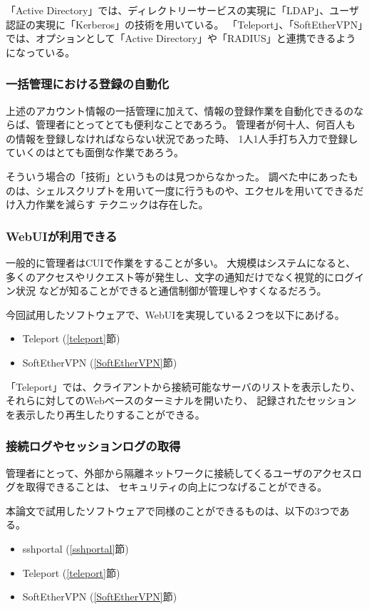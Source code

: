 \documentclass[11pt,a4j,titlepage]{jreport}
\begin{document}
「Active Directory」では、ディレクトリーサービスの実現に「LDAP」、ユーザ認証の実現に「Kerberos」の技術を用いている。
「Teleport」、「SoftEtherVPN」では、オプションとして「Active Directory」や「RADIUS」と連携できるようになっている。

\subsubsection*{一括管理における登録の自動化}
上述のアカウント情報の一括管理に加えて、情報の登録作業を自動化できるのならば、管理者にとってとても便利なことであろう。
管理者が何十人、何百人もの情報を登録しなければならない状況であった時、
1人1人手打ち入力で登録していくのはとても面倒な作業であろう。
\par そういう場合の「技術」というものは見つからなかった。
調べた中にあったものは、シェルスクリプトを用いて一度に行うものや、エクセルを用いてできるだけ入力作業を減らす
テクニックは存在した。

\subsubsection*{WebUIが利用できる}
一般的に管理者はCUIで作業をすることが多い。
大規模はシステムになると、多くのアクセスやリクエスト等が発生し、文字の通知だけでなく視覚的にログイン状況
などが知ることができると通信制御が管理しやすくなるだろう。
\par 今回試用したソフトウェアで、WebUIを実現している２つを以下にあげる。
\begin{itemize}
    \item Teleport (\ref{teleport}節)
    \item SoftEtherVPN (\ref{SoftEtherVPN}節)
\end{itemize}
「Teleport」では、クライアントから接続可能なサーバのリストを表示したり、それらに対してのWebベースのターミナルを開いたり、
記録されたセッションを表示したり再生したりすることができる。


\subsubsection*{接続ログやセッションログの取得}
管理者にとって、外部から隔離ネットワークに接続してくるユーザのアクセスログを取得できることは、
セキュリティの向上につなげることができる。

\par 本論文で試用したソフトウェアで同様のことができるものは、以下の3つである。
\begin{itemize}
    \item sshportal (\ref{sshportal}節)
    \item Teleport (\ref{teleport}節)
    \item SoftEtherVPN (\ref{SoftEtherVPN}節)
\end{itemize}
\end{document}
